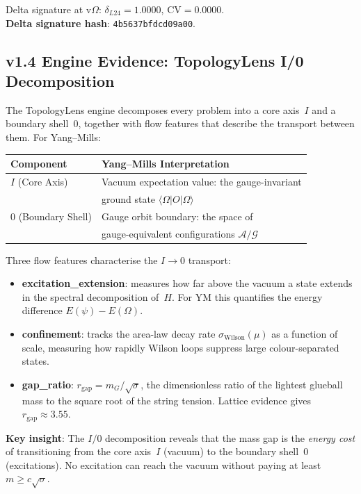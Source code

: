 \documentclass[11pt]{article}
\begin{document}
\noindent Delta signature at v$\Omega$:
$\delta_{L24} = 1.0000$, $\mathrm{CV} = 0.0000$.\\
\textbf{Delta signature hash}: \texttt{4b5637bfdcd09a00}.

\subsection{v1.4 Engine Evidence: TopologyLens I/0 Decomposition}

The TopologyLens engine decomposes every problem into a core axis~$I$
and a boundary shell~$0$, together with flow features that describe the
transport between them.  For Yang--Mills:

\begin{center}
\begin{tabular}{|l|l|}
\hline
\textbf{Component} & \textbf{Yang--Mills Interpretation} \\
\hline
$I$ (Core Axis) & Vacuum expectation value: the gauge-invariant \\
 & ground state $\langle\Omega|O|\Omega\rangle$ \\
\hline
$0$ (Boundary Shell) & Gauge orbit boundary: the space of \\
 & gauge-equivalent configurations $\mathcal{A}/\mathcal{G}$ \\
\hline
\end{tabular}
\end{center}

\noindent
Three flow features characterise the $I \to 0$ transport:
\begin{itemize}
  \item \textbf{excitation\_extension}: measures how far above the vacuum
    a state extends in the spectral decomposition of~$H$.  For YM this
    quantifies the energy difference $E(\psi) - E(\Omega)$.
  \item \textbf{confinement}: tracks the area-law decay rate
    $\sigma_{\mathrm{Wilson}}(\mu)$ as a function of scale, measuring how
    rapidly Wilson loops suppress large colour-separated states.
  \item \textbf{gap\_ratio}: $r_{\mathrm{gap}} = m_G / \sqrt{\sigma}$,
    the dimensionless ratio of the lightest glueball mass to the square
    root of the string tension.  Lattice evidence gives $r_{\mathrm{gap}}
    \approx 3.55$.
\end{itemize}

\noindent
\textbf{Key insight}: The $I/0$ decomposition reveals that the mass gap
is the \emph{energy cost} of transitioning from the core axis~$I$
(vacuum) to the boundary shell~$0$ (excitations).  No excitation can
reach the vacuum without paying at least $m \geq c\sqrt{\sigma}$.
\end{document}
